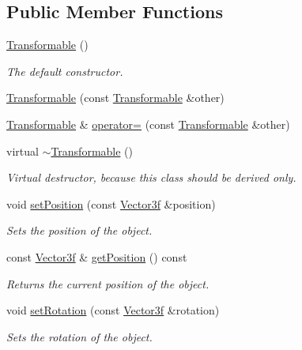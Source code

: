 \subsection*{Public Member Functions}
\begin{DoxyCompactItemize}
\item 
\hyperlink{classburn_1_1_transformable_ab5df8f6f319ebc8888465632a1567981}{Transformable} ()
\begin{DoxyCompactList}\small\item\em The default constructor. \end{DoxyCompactList}\item 
\hyperlink{classburn_1_1_transformable_a96fb19be22efcefb4723781146de28fe}{Transformable} (const \hyperlink{classburn_1_1_transformable}{Transformable} \&other)
\item 
\hyperlink{classburn_1_1_transformable}{Transformable} \& \hyperlink{classburn_1_1_transformable_aee23249ee60e4a3e590046e633c3a979}{operator=} (const \hyperlink{classburn_1_1_transformable}{Transformable} \&other)
\item 
virtual \hyperlink{classburn_1_1_transformable_ac3b6e91f17a6b8f5db8027e72942f269}{$\sim$\-Transformable} ()
\begin{DoxyCompactList}\small\item\em Virtual destructor, because this class should be derived only. \end{DoxyCompactList}\item 
void \hyperlink{classburn_1_1_transformable_a408d484d0ed48c1d7499391b3f2d4a66}{set\-Position} (const \hyperlink{namespaceburn_afdd7cfb352b9612432faf6947b6fff74}{Vector3f} \&position)
\begin{DoxyCompactList}\small\item\em Sets the position of the object. \end{DoxyCompactList}\item 
const \hyperlink{namespaceburn_afdd7cfb352b9612432faf6947b6fff74}{Vector3f} \& \hyperlink{classburn_1_1_transformable_aab2eb6fb8e64349a9f83bc6939477b74}{get\-Position} () const 
\begin{DoxyCompactList}\small\item\em Returns the current position of the object. \end{DoxyCompactList}\item 
void \hyperlink{classburn_1_1_transformable_adad877d654e3ac20ed0ff6edf002e040}{set\-Rotation} (const \hyperlink{namespaceburn_afdd7cfb352b9612432faf6947b6fff74}{Vector3f} \&rotation)
\begin{DoxyCompactList}\small\item\em Sets the rotation of the object. \end{DoxyCompactList}\item 

\end{DoxyCompactItemize}
